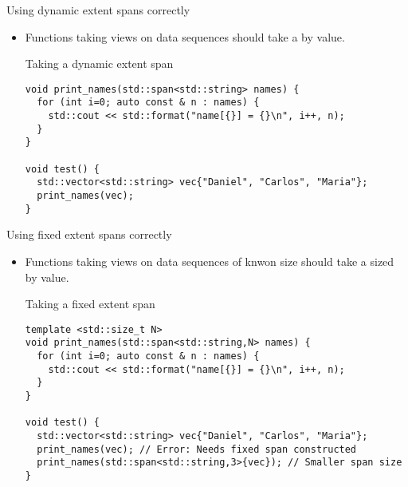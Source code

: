 \begin{frame}[t,fragile]{Using dynamic extent spans correctly}
\begin{itemize}
  \item Functions taking views on data sequences should take
        a  by value.
\begin{block}{Taking a dynamic extent span}
\begin{lstlisting}
void print_names(std::span<std::string> names) {
  for (int i=0; auto const & n : names) {
    std::cout << std::format("name[{}] = {}\n", i++, n);
  }
}

void test() {
  std::vector<std::string> vec{"Daniel", "Carlos", "Maria"};
  print_names(vec);
}
\end{lstlisting}
\end{block}

\end{itemize}
\end{frame}


\begin{frame}[t,fragile]{Using fixed extent spans correctly}
\begin{itemize}
  \item Functions taking views on data sequences of knwon size should take
        a sized  by value.
\begin{block}{Taking a fixed extent span}
\begin{lstlisting}
template <std::size_t N>
void print_names(std::span<std::string,N> names) {
  for (int i=0; auto const & n : names) {
    std::cout << std::format("name[{}] = {}\n", i++, n);
  }
}

void test() {
  std::vector<std::string> vec{"Daniel", "Carlos", "Maria"};
  print_names(vec); // Error: Needs fixed span constructed
  print_names(std::span<std::string,3>{vec}); // Smaller span size
}
\end{lstlisting}
\end{block}

\end{itemize}
\end{frame}
